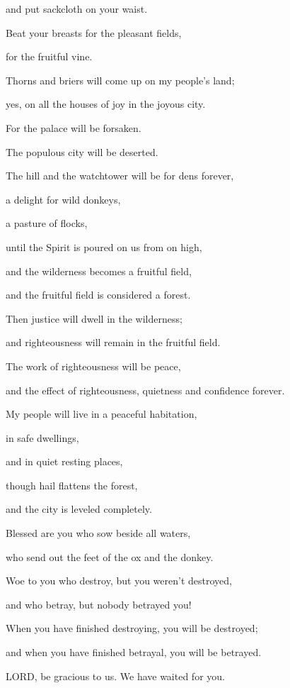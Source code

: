 and put sackcloth on your waist.

\myverse{}Beat your breasts for the pleasant fields,

for the fruitful vine.

\myverse{}Thorns and briers will come up on my people’s land;

yes, on all the houses of joy in the joyous city.

\myverse{}For the palace will be forsaken.

The populous city will be deserted.

The hill and the watchtower will be for dens forever,

a delight for wild donkeys,

a pasture of flocks,

\myverse{}until the Spirit is poured on us from on high,

and the wilderness becomes a fruitful field,

and the fruitful field is considered a forest.


\vspace{\baselineskip} \myverse{}Then justice will dwell in the wilderness;

and righteousness will remain in the fruitful field.

\myverse{}The work of righteousness will be peace,

and the effect of righteousness, quietness and confidence forever.

\myverse{}My people will live in a peaceful habitation,

in safe dwellings,

and in quiet resting places,

\myverse{}though hail flattens the forest,

and the city is leveled completely.

\myverse{}Blessed are you who sow beside all waters,

who send out the feet of the ox and the donkey.


\mychapter{} \myverse*{}Woe to you who destroy, but you weren’t destroyed,

\quad\quad and who betray, but nobody betrayed you!

When you have finished destroying, you will be destroyed;

and when you have finished betrayal, you will be betrayed.


\vspace{\baselineskip} \myverse{}LORD, be gracious to us. We have waited for you.


